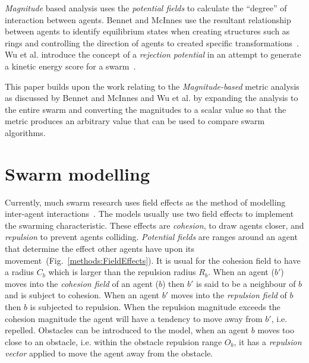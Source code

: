 \documentclass{ieeeaccess}
\begin{document}
\textit{Magnitude} based analysis uses the \textit{potential fields} to calculate the ``degree'' of interaction between agents. Bennet and McInnes use the resultant relationship between agents to identify equilibrium states when creating structures such as rings and controlling the direction of agents to created specific transformations~\cite{BM:09}. Wu et al. introduce the concept of a \textit{rejection potential} in an attempt to generate a kinetic energy score for a swarm~\cite{WCW:11}.

This paper builds upon the work relating to the \textit{Magnitude-based} metric analysis as discussed by Bennet and McInnes and Wu et al. by expanding the analysis to the entire swarm and converting the magnitudes to a scalar value so that the metric produces an arbitrary value that can be used to compare swarm algorithms.

\section{Swarm modelling}\label{Section:SwarmModelling}
Currently, much swarm research uses field effects as the method of modelling inter-agent interactions~\cite{BAF:06, BAFVM:06, BM:09, APZDAMC:09, GP:02, GP:04, GP:04a, GP:05, GP:11, MYP:09}. The models usually use two field effects to implement the swarming characteristic. These effects are \textit{cohesion}, to draw agents closer, and \textit{repulsion} to prevent agents colliding. \textit{Potential fields} are ranges around an agent that determine the effect other agents have upon its movement~(Fig.~\ref{methods:FieldEffects}). It is usual for the cohesion field to have a radius $C_b$ which is larger than the repulsion radius $R_b$. When an agent ($b'$) moves into the \textit{cohesion field} of an agent ($b$) then $b'$ is said to be a neighbour of $b$ and is subject to cohesion. When an agent $b'$ moves into the \textit{repulsion field} of $b$ then $b$ is subjected to repulsion. When the repulsion magnitude exceeds the cohesion magnitude the agent will have a tendency to move away from $b'$, i.e. repelled. Obstacles can be introduced to the model, when an agent $b$ moves too close to an obstacle, i.e. within the obstacle repulsion range $O_b$, it has a \textit{repulsion vector} applied to move the agent away from the obstacle.
\end{document}

